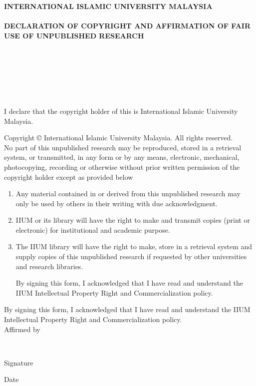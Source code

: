 \documentclass[12pt, a4paper]{memoir}
\begin{document}
\thispagestyle{empty}

\begin{center}
\begin{Large}
\textbf{\MakeUppercase{International Islamic University Malaysia}}\\~\\
\textbf{\MakeUppercase{Declaration of Copyright and Affirmation of Fair Use of 
Unpublished Research}}\\~\\
\textbf{\MakeUppercase{\myTitle}}\\
\ifdefined\mySubtitle
\textbf{\MakeUppercase{\mySubtitle}}\\~\\
\else
\\~\\
\fi
\end{Large}
\noindent I declare that the copyright holder of this \myDocument is 
International Islamic University Malaysia.\\
\end{center}

{\fontsize{10bp}{12bp}\selectfont
\noindent Copyright \copyright{} \myYear International Islamic 
University 
Malaysia. All rights reserved.}\\

\noindent No part of this unpublished research may be reproduced, stored in a 
retrieval
system, or transmitted, in any form or by any means, electronic, mechanical,
photocopying, recording or otherwise without prior written permission of the
copyright holder except as provided below

\begin{enumerate}
\item Any material contained in or derived from this unpublished research
may only be used by others in their writing with due acknowledgment.

\item IIUM or its library will have the right to make and transmit copies
(print or electronic) for institutional and academic purpose.

\item The IIUM library will have the right to make, store in a retrieval system
and supply copies of this unpublished research if requested by other
universities and research libraries.

By signing this form, I acknowledged that I have read and understand the
IIUM Intellectual Property Right and Commercialization policy.
\end{enumerate}

\noindent By signing this form, I acknowledged that I have read and understand 
the
IIUM Intellectual Property Right and Commercialization policy.\\[48pt]

\noindent Affirmed by \myName\\

\vfill

\noindent \makebox[2in]{\dotfill} \hfill \makebox[2in]{\dotfill}\\
\parbox{2in}{\centering Signature} \hfill \parbox{2in}{\centering Date}
\end{document}
